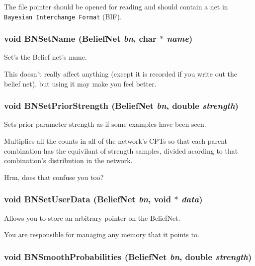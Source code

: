 The file pointer should be opened for reading and should contain a net in {\tt Bayesian Interchange Format} (BIF). 
\subsubsection{\setlength{\rightskip}{0pt plus 5cm}void BNSet\-Name ({\bf Belief\-Net} {\em bn}, char $\ast$ {\em name})}\label{BeliefNet_8h_a52}


Set's the Belief net's name. 

This doesn't really affect anything (except it is recorded if you write out the belief net), but using it may make you feel better. 
\subsubsection{\setlength{\rightskip}{0pt plus 5cm}void BNSet\-Prior\-Strength ({\bf Belief\-Net} {\em bn}, double {\em strength})}\label{BeliefNet_8h_a71}


Sets prior parameter strength as if some examples have been seen. 

Multiplies all the counts in all of the network's CPTs so that each parent combination has the equivilant of strength samples, divided acording to that combination's distribution in the network.

Hrm, does that confuse you too? 
\subsubsection{\setlength{\rightskip}{0pt plus 5cm}void BNSet\-User\-Data ({\bf Belief\-Net} {\em bn}, void $\ast$ {\em data})}\label{BeliefNet_8h_a73}


Allows you to store an arbitrary pointer on the Belief\-Net. 

You are responsible for managing any memory that it points to. 
\subsubsection{\setlength{\rightskip}{0pt plus 5cm}void BNSmooth\-Probabilities ({\bf Belief\-Net} {\em bn}, double {\em strength})}\label{BeliefNet_8h_a72}


